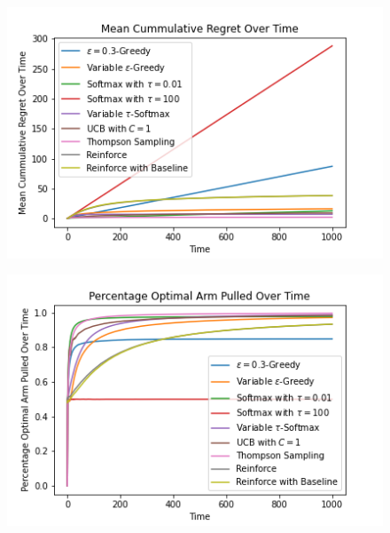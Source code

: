 \documentclass{article}
\begin{document}
		\begin{figure}[H]
			\graphicspath{ {../Experiments/Normal_5_0.01_every_case/} }
			\centering
			\begin{minipage}{.5\textwidth}
			  \centering
			  \includegraphics[width=\linewidth]{Mean_Cummulative_Regret_Over_Time.png}
			  \label{fig:test1}
			\end{minipage}%
			\begin{minipage}{.5\textwidth}
			  \centering
			  \includegraphics[width=\linewidth]{Percentage_Optimal_Arm_Pulled_Over_Time.png}
			  \label{fig:test2}
			\end{minipage}
			\end{figure}
			
\end{document}
